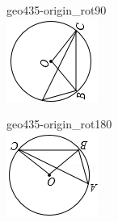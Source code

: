 \documentclass[12pt]{article}
\begin{document}
\begin{center}
\begin{minipage}{0.32\textwidth}
\end{minipage}
\hfill\begin{minipage}{0.32\textwidth}\centering
geo435-origin\_rot90\\
\includegraphics[width=0.95\linewidth]{out_rommath_origin/items/geo435-origin/assets/figure_rot90.png}
\end{minipage}
\par\medskip
\begin{minipage}{0.32\textwidth}\centering
geo435-origin\_rot180\\
\includegraphics[width=0.95\linewidth]{out_rommath_origin/items/geo435-origin/assets/figure_rot180.png}

\end{minipage}
\end{center}
\end{document}
